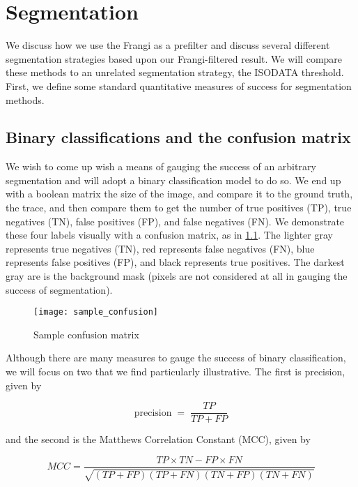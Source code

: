 \chapter{Segmentation} \label{ch:segmentation}

We discuss how we use the Frangi as a prefilter and discuss several different segmentation strategies based upon our Frangi-filtered result. We will compare these methods to an unrelated segmentation strategy, the ISODATA threshold. First, we define some standard quantitative measures of success for segmentation methods.


\section{Binary classifications and the confusion matrix}

We wish to come up wish a means of gauging the success of an arbitrary segmentation and will adopt a binary classification model to do so.
We end up with a boolean matrix the size of the image, and compare it to the ground truth, the trace, and then compare them to get the number of true positives (TP), true negatives (TN), false positives (FP), and false negatives (FN). We demonstrate these four labels visually with a confusion matrix, as in \cref{fig:sample-confusion}. The lighter gray represents true negatives (TN), red represents false negatives (FN), blue represents false positives (FP), and black represents true positives. The darkest gray are is the background mask (pixels are not considered at all in gauging the success of segmentation).
 
\begin{figure}
  \centering
  \texttt{[image: sample\_confusion]}
  \caption{Sample confusion matrix}
  \label{fig:sample-confusion}
\end{figure}

Although there are many measures to gauge the success of binary classification, we will focus on two that we find particularly illustrative. The first is precision, given by

\begin{equation}
\label{eq:precision}
\textrm{precision} \;=\; \frac{TP}{TP+FP}
\end{equation}

and the second is the Matthews Correlation Constant (MCC), given by

\begin{equation} \label{eq:MCC}
MCC = \frac{TP\times TN - FP \times FN}{\sqrt{ (TP + FP)(TP+FN)(TN+FP)(TN+FN)}}
\end{equation}

